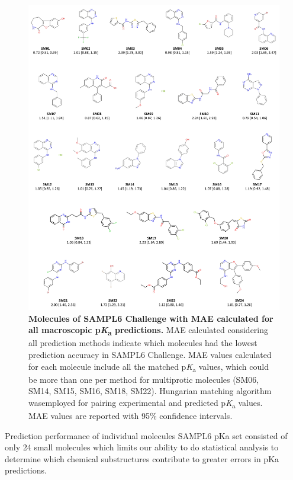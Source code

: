 \documentclass[9pt,lineno,final]{elife}
\newcommand{\pKa}{p\textit{K}\textsubscript{a}}
\begin{document}
\begin{figure}
\begin{center}
\includegraphics[width=0.95\linewidth]{figures/molecules_with_MAE_of_all_methods.pdf}
\caption{{\bf Molecules of SAMPL6 Challenge with MAE calculated for all macroscopic \pKa{} predictions.} MAE calculated considering all prediction methods indicate which molecules had the lowest prediction accuracy in SAMPL6 Challenge. MAE values calculated for each molecule include all the matched \pKa{} values, which could be more than one per method for multiprotic molecules (SM06, SM14, SM15, SM16, SM18, SM22). Hungarian matching algorithm wasemployed for pairing experimental and predicted \pKa{} values. MAE values are reported with 95\% confidence intervals.
}
\label{fig:molecules_with_MAE_of_all_methods}
\end{center}
\end{figure}

Prediction performance of individual molecules
SAMPL6 pKa set consisted of only 24 small molecules which limits our ability to do statistical analysis to determine which chemical substructures contribute to greater errors in pKa predictions.
\end{document}

